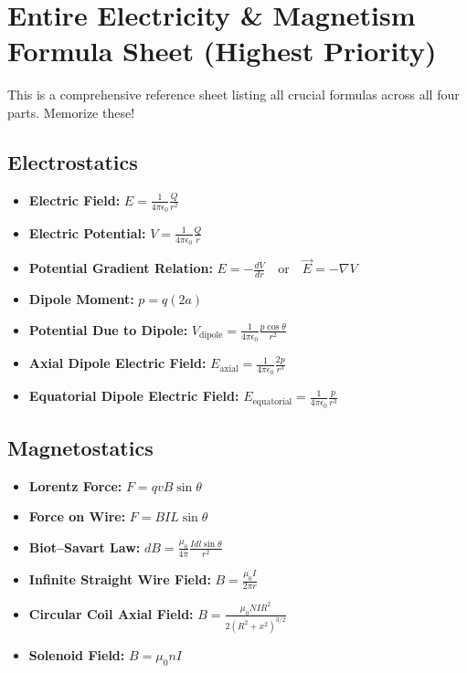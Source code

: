 \documentclass[11pt,a4paper]{article}
\begin{document}
\section{Entire Electricity \& Magnetism Formula Sheet (Highest Priority)}

This is a comprehensive reference sheet listing all crucial formulas across all four parts. Memorize these!

\subsection{Electrostatics}
\begin{itemize}
    \item \textbf{Electric Field:} $E = \frac{1}{4\pi\epsilon_0}\frac{Q}{r^2}$
    \item \textbf{Electric Potential:} $V = \frac{1}{4\pi\epsilon_0}\frac{Q}{r}$
    \item \textbf{Potential Gradient Relation:} $E = -\frac{dV}{dr} \quad \text{or} \quad \vec{E} = -\nabla V$
    \item \textbf{Dipole Moment:} $p = q(2a)$
    \item \textbf{Potential Due to Dipole:} $V_{\text{dipole}} = \frac{1}{4\pi\epsilon_0}\frac{p\cos\theta}{r^2}$
    \item \textbf{Axial Dipole Electric Field:} $E_{\text{axial}} = \frac{1}{4\pi\epsilon_0}\frac{2p}{r^3}$
    \item \textbf{Equatorial Dipole Electric Field:} $E_{\text{equatorial}} = \frac{1}{4\pi\epsilon_0}\frac{p}{r^3}$
\end{itemize}

\subsection{Magnetostatics}
\begin{itemize}
    \item \textbf{Lorentz Force:} $F = qvB\sin\theta$
    \item \textbf{Force on Wire:} $F = BIL\sin\theta$
    \item \textbf{Biot--Savart Law:} $dB = \frac{\mu_0}{4\pi}\frac{Idl\sin\theta}{r^2}$
    \item \textbf{Infinite Straight Wire Field:} $B = \frac{\mu_0I}{2\pi r}$
    \item \textbf{Circular Coil Axial Field:} $B = \frac{\mu_0NIR^2}{2(R^2+x^2)^{3/2}}$
    \item \textbf{Solenoid Field:} $B = \mu_0 n I$
\end{itemize}
\end{document}
